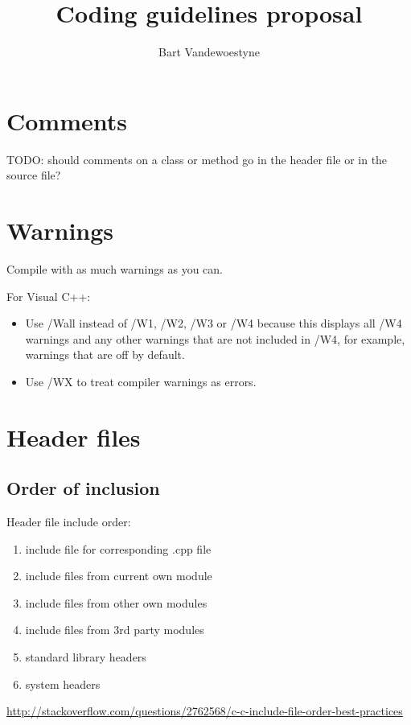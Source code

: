 \documentclass{article}
\title{Coding guidelines proposal}
\author{Bart Vandewoestyne}
\begin{document}
	

\maketitle

\tableofcontents

\section{Comments}

TODO: should comments on a class or method go in the header file or in the source file?

\section{Warnings}

Compile with as much warnings as you can.

For Visual C++:
\begin{itemize}
	\item Use /Wall instead of /W1, /W2, /W3 or /W4 because this displays all /W4 warnings and any other warnings that are not included in /W4, for example, warnings that are off by default.
	\item Use /WX to treat compiler warnings as errors.
\end{itemize}

\section{Header files}

\subsection{Order of inclusion}
Header file include order:
\begin{enumerate}
\item include file for corresponding .cpp file
\item include files from current own module
\item include files from other own modules
\item include files from 3rd party modules
\item standard library headers
\item system headers
\end{enumerate}
\url{http://stackoverflow.com/questions/2762568/c-c-include-file-order-best-practices}
\end{document}
